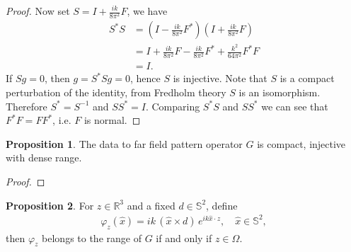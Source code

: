 \documentclass[a4paper,12pt]{article}
\theoremstyle{definition}
\newtheorem{prp}{Proposition}
\begin{document}
\begin{proof}
  Now set $S=I + \frac{ik}{8\pi^2}F$, we have
  \begin{align*}
    S^*S&=\left(I - \frac{ik}{8\pi^2}F^*\right)\left(I + \frac{ik}{8\pi^2}F\right)\\
        &= I + \frac{ik}{8\pi^2}F - \frac{ik}{8\pi^2}F^* + \frac{k^2}{64\pi^2}F^*F\\
        &= I. 
  \end{align*}
  If $Sg=0$, then $g=S^*Sg=0$, hence $S$ is injective. Note that $S$ is a compact perturbation of the identity, from Fredholm theory $S$ is an isomorphism. Therefore $S^*=S^{-1}$ and $SS^*=I$. Comparing $S^*S$ and $SS^*$ we can see that $F^*F=FF^*$, i.e. $F$ is normal.
\end{proof}

\begin{prp}
  The data to far field pattern operator $G$ is compact, injective with dense range.
\end{prp}

\begin{proof}

\end{proof}

\begin{prp}
  For $z\in\mathbb{R}^3$ and a fixed $d\in\mathbb{S}^2$, define
  \begin{align*}
    \varphi_z(\hat{x}) = ik\,(\hat{x}\times d)\,e^{ik\hat{x}\cdot z},\quad\hat{x}\in\mathbb{S}^2,
  \end{align*}
  then $\varphi_z$ belongs to the range of $G$ if and only if $z\in\Omega$.
\end{prp}
\end{document}
